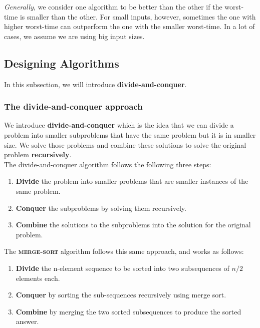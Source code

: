 \documentclass[12pt]{article}
\begin{document}
\textit{Generally}, we consider one algorithm to be better than the other if the worst-time is smaller than the other. For small inputs, however, sometimes the one with higher worst-time can outperform the one with the smaller worst-time. In a lot of cases, we assume we are using big input sizes.\\


\newpage


\subsection{Designing Algorithms}

In this subsection, we will introduce \textbf{divide-and-conquer}.

\subsubsection{The divide-and-conquer approach}

We introduce \textbf{divide-and-conquer} which is the idea that we can divide a problem into smaller subproblems that have the same problem but it is in smaller size. We solve those problems and combine these solutions to solve the original problem \textbf{recursively}. \\

The divide-and-conquer algorithm follows the following three steps:
\begin{enumerate}
  \item \textbf{Divide} the problem into smaller problems that are smaller instances of the same problem.
  \item \textbf{Conquer} the subproblems by solving them recursively.
  \item \textbf{Combine} the solutions to the subproblems into the solution for the original problem.
\end{enumerate}

The \textsc{\textbf{merge-sort}} algorithm follows this same approach, and works as follows:

\begin{enumerate}
  \item \textbf{Divide} the n-element sequence to be sorted into two subsequences of $n/2$ elements each.
  \item \textbf{Conquer} by sorting the sub-sequences recursively using merge sort.
  \item \textbf{Combine} by merging the two sorted subsequences to produce the sorted answer.
\end{enumerate}
\end{document}

